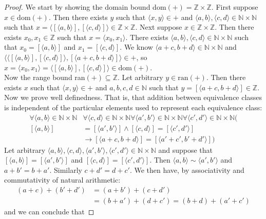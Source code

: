 \documentclass{report}
\begin{document}
\begin{proof}
We start by showing the domain bound dom$(+)=\mathbb Z\times\mathbb Z$. First suppose $x\in\text{dom}(+)$. Then there exists $y$ such that $\langle x,y\rangle\in+$ and
$\langle a,b\rangle,\langle c,d\rangle\in\mathbb N\times\mathbb N$ such
that $x=\langle[\langle a,b\rangle],[\langle c,d\rangle]\rangle\in\mathbb Z\times\mathbb Z$.
Next suppose $x\in\mathbb Z\times\mathbb Z$. Then there exists $x_0,x_1\in\mathbb Z$ such that
$x=\langle x_0,x_1\rangle$. There exists $\langle a,b\rangle,\langle c,d\rangle\in\mathbb N\times\mathbb N$ such that $x_0=[\langle a,b\rangle]$
and $x_1=[\langle c,d\rangle]$. We know $\langle a+c,b+d\rangle\in\mathbb N\times\mathbb N$ and
$\langle\langle[\langle a,b\rangle],[\langle c,d\rangle]\rangle,[\langle a+c,b+d\rangle]\rangle\in+$, so
$x=\langle x_0,x_1\rangle=\langle[\langle a,b\rangle],[\langle c,d\rangle]\rangle\in\text{dom}(+)$.\\
\indent Now the range bound ran$(+)\subseteq\mathbb Z$. Let arbitrary $y\in\text{ran}(+)$. Then there exists $x$ such that $\langle x,y\rangle\in+$ and $a,b,c,d\in\mathbb N$ such that
$y=[\langle a+c,b+d\rangle]\in\mathbb Z$.\\
\indent Now we prove well definedness. That is, that addition between equivalence classes is independent of the particular elements used to represent each equivalence class:
\begin{align*}
\forall\langle a,b\rangle\in\mathbb N\times\mathbb N&\forall\langle c,d\rangle\in\mathbb N\times\mathbb N
\forall\langle a',b'\rangle\in\mathbb N\times\mathbb N\forall\langle c',d'\rangle\in\mathbb N\times\mathbb N(\\
[\langle a,b\rangle]&=[\langle a',b'\rangle]\land[\langle c,d\rangle]=[\langle c',d'\rangle]\\
&\to[\langle a+c,b+d\rangle]=[\langle a'+c',b'+d'\rangle])
\end{align*}
Let arbitrary $\langle a,b\rangle,\langle c,d\rangle,\langle a',b'\rangle,\langle c',d'\rangle\in\mathbb N\times\mathbb N$ and suppose that $[\langle a,b\rangle]=[\langle a',b'\rangle]$
and $[\langle c,d\rangle]=[\langle c',d'\rangle]$. Then $\langle a,b\rangle\sim\langle a',b'\rangle$ and $a+b'=b+a'$. Similarly $c+d'=d+c'$. We then have, by associativity and commutativity of 
natural arithmetic:
\begin{align*}
(a+c)+(b'+d')&=(a+b')+(c+d')\\
&=(b+a')+(d+c')=(b+d)+(a'+c')
\end{align*}
and we can conclude that 

\end{proof}
\end{document}
